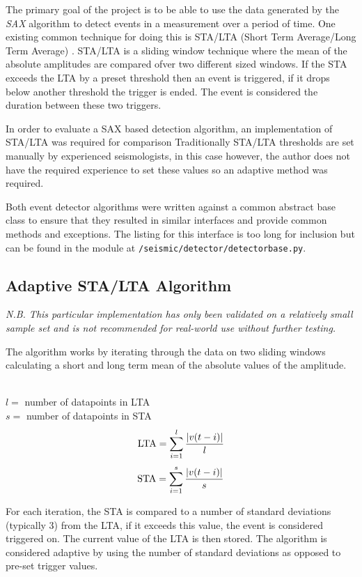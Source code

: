 \documentclass[../report.tex]{subfiles}
\begin{document}
 
	The primary goal of the project is to be able to use the data generated by the \textit{SAX} algorithm to detect events in a measurement over a period of time.  One existing common technique for doing this is STA/LTA (Short Term Average/Long Term Average) \citep{man-seis-obs}.  STA/LTA is a sliding window technique where the mean of the absolute amplitudes are compared ofver two different sized windows.  If the STA exceeds the LTA by a preset threshold then an event is triggered, if it drops below another threshold the trigger is ended.  The event is considered the duration between these two triggers.
	
	In order to evaluate a SAX based detection algorithm, an implementation of STA/LTA was required for comparison  Traditionally STA/LTA thresholds are set manually by experienced seismologists, in this case however, the author does not have the required experience to set these values so an adaptive method was required.
	
	Both event detector algorithms were written against a common abstract base class to ensure that they resulted in similar interfaces and provide common methods and exceptions.  The listing for this interface is too long for inclusion but can be found in the module at \texttt{/seismic/detector/detectorbase.py}.
	
\subsection{Adaptive STA/LTA Algorithm} \label{sec:stalta-detect}

	\textit{N.B.  This particular implementation has only been validated on a relatively small sample set and is not recommended for real-world use without further testing.}

	The algorithm works by iterating through the data on two sliding windows calculating a short and long term mean of the absolute values of the amplitude.

	\noindent
	\\
	$l = $ number of datapoints in LTA \\
	$s = $ number of datapoints in STA \\

	$$ \text{LTA} = \sum_{i=1}^{l}\dfrac{\abs{v(t - i)}}{l} $$
	$$ \text{STA} = \sum_{i=1}^{s}\dfrac{\abs{v(t - i)}}{s} $$

	
	For each iteration, the STA is compared to a number of standard deviations (typically 3) from the LTA, if it exceeds this value, the event is considered triggered on.  The current value of the LTA is then stored.  The algorithm is considered adaptive by using the number of standard deviations as opposed to pre-set trigger values.
	
\end{document}
